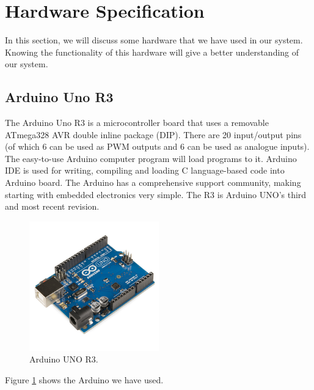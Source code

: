 \section{Hardware Specification}
In this section, we will discuss some hardware that we have used in our system. Knowing the functionality of this hardware will give a better understanding of our
system.
\subsection{Arduino Uno R3}
The Arduino Uno R3 is a microcontroller board that uses a removable ATmega328 AVR double inline package (DIP). There are 20 input/output pins (of which 6 can be used as PWM outputs and 6 can be used as analogue inputs). The easy-to-use Arduino computer program will load programs to it. Arduino IDE is used for writing, compiling and loading C language-based code into Arduino board. The Arduino has a comprehensive support community, making starting with embedded electronics very simple. The R3 is Arduino UNO's third and most recent revision.
\begin{figure}[H]
\centering
\includegraphics[width=0.5\textwidth]{figures/Arduino_Uno_-_R3.jpg}
\caption{Arduino UNO R3.}
\label{Arduino}
\end{figure}
Figure \ref{Arduino} shows the Arduino we have used.
